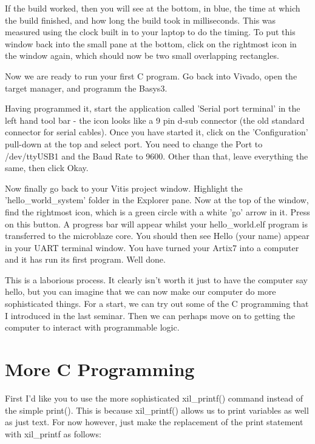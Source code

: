 \documentclass[../physical_computing.tex]{subfiles}
\begin{document}
If the build worked, then you will see at the bottom, in blue,
the time at which the build finished, and how long the build took
in milliseconds. This was measured using the clock built in to 
your laptop to do the timing. To put this window back into the 
small pane at the bottom, click on the rightmost icon in the 
window again, which should now be two small overlapping rectangles.

Now we are ready to run your first C program. Go back into Vivado,
open the target manager, and programm the Basys3.

Having programmed it, start the application called 'Serial port
terminal' in the left hand tool bar - the icon looks like a 
9 pin d-sub connector (the old standard connector for serial 
cables). Once you have started it, click on the 'Configuration'
pull-down at the top and select port. You need to change the 
Port to /dev/ttyUSB1 and the Baud Rate to 9600. Other than that,
leave everything the same, then click Okay.

Now finally go back to your Vitis project window. Highlight the\\
\mbox{'hello\_world\_system'} folder in the Explorer pane. Now at the top
of the window, find the rightmost icon, which is a green circle
with a white 'go' arrow in it. Press on this button. A progress
bar will appear whilst your hello\_world.elf program is transferred
to the microblaze core. You should then see Hello (your name) appear
in your UART terminal window. You have turned your Artix7 into
a computer and it has run its first program. Well done.

This is a laborious process. It clearly isn't worth it just to have
the computer say hello, but you can imagine that we can now make
our computer do more sophisticated things. For a start, we can 
try out some of the C programming that I introduced in the last
seminar. Then we can perhaps move on to getting the computer to 
interact with programmable logic.

\section{More C Programming}
\label{sec:morecprogramming}

First I'd like you to use the more sophisticated xil\_printf() command
instead of the simple print(). This is because xil\_printf() allows
us to print variables as well as just text. For now however, just 
make the replacement of the print statement with xil\_printf as
follows:
\end{document}
